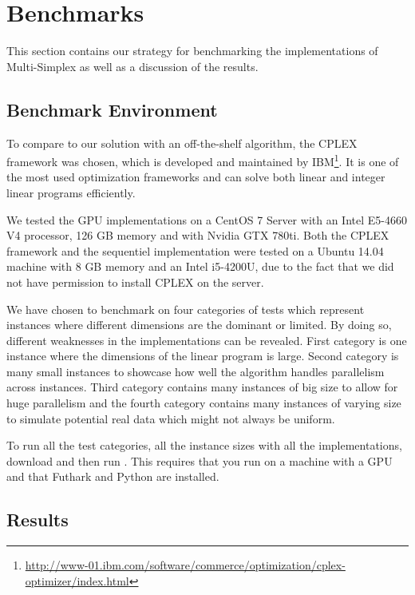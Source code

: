 \section{Benchmarks}

This section contains our strategy for benchmarking the implementations of Multi-Simplex as well as a discussion of the results.

\subsection{Benchmark Environment}
To compare to our solution with an off-the-shelf algorithm, the CPLEX framework was chosen, which is developed and maintained by IBM\footnote{\url{http://www-01.ibm.com/software/commerce/optimization/cplex-optimizer/index.html}}. It is one of the most used optimization frameworks and can solve both linear and integer linear programs efficiently.

We tested the GPU implementations on a CentOS 7 Server with an Intel E5-4660 V4 processor, 126 GB memory and with Nvidia GTX 780ti. Both the CPLEX framework and the sequentiel 
implementation were tested on a Ubuntu 14.04 machine with 8 GB memory and an Intel i5-4200U, due to the fact that we did not have permission to install CPLEX on the server.

\newpar We have chosen to benchmark on four categories of tests which represent instances where different dimensions are the dominant or limited. By doing so, different weaknesses in the implementations can be revealed. First category is one instance where the dimensions of the linear program is large. Second category is many small instances to showcase how well the algorithm handles parallelism across instances. Third category contains many instances of big size to allow for huge parallelism and the fourth category contains many instances of varying size to simulate potential real data which might not always be uniform.

\newpar To run all the test categories, all the instance sizes with all the implementations, download  and then run . This requires that you run on a machine with a GPU and that Futhark and Python are installed.

\subsection{Results}

